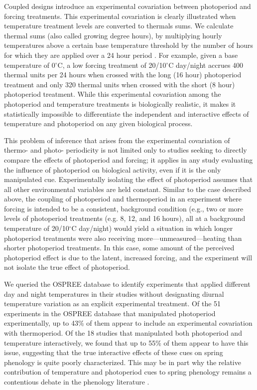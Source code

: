 \documentclass[11pt]{article}
\begin{document}
Coupled designs introduce an experimental covariation between photoperiod and forcing treatments. This experimental covariation is clearly illustrated when temperature treatment levels are converted to thermals sums. We calculate thermal sums (also called growing degree hours), by multiplying hourly temperatures above a certain base temperature threshold by the number of hours for which they are applied over a 24 hour period \citep{Parent:2019ug}. For example, given a base temperature of 0$^{\circ}$C, a low forcing treatment of 20/10$^{\circ}$C day/night accrues 400 thermal units per 24 hours  when crossed with the long (16 hour) photoperiod treatment and only 320 thermal units when crossed with the short (8 hour) photoperiod treatment. While this experimental covariation among the photoperiod and temperature treatments is biologically realistic, it makes it statistically impossible to differentiate the independent and interactive effects of temperature and photoperiod on any given biological process.

This problem of inference that arises from the experimental covariation of thermo- and photo- periodicity is not limited only to studies seeking to directly compare the effects of photoperiod and forcing; it applies in any study evaluating the influence of photoperiod on biological activity, even if it is the only manipulated cue. Experimentally isolating the effect of photoperiod assumes that all other environmental variables are held constant.  Similar to the case described above, the coupling of photoperiod and thermoperiod in an experiment where forcing is intended to be a consistent, background condition (e.g., two or more levels of photoperiod treatments (e.g. 8, 12, and 16 hours), all at a background temperature of 20/10$^{\circ}$C day/night) would yield a situation in which longer photoperiod treatments were also receiving more---unmeasured---heating than shorter photoperiod treatments. In this case, some amount of the perceived photoperiod effect is due to the latent, increased forcing, and the experiment will not isolate the true effect of photoperiod.

We queried the OSPREE database to identify experiments that applied different day and night temperatures in their studies without designating diurnal temperature variation as an explicit experimental treatment. Of the 51 experiments in the OSPREE database that manipulated photoperiod experimentally, up to 43\% of them appear to include an experimental covariation with thermoperiod. Of the 18 studies that manipulated both photoperiod and temperature interactively, we found that up to 55\% of them appear to have this issue, suggesting that the true interactive effects of these cues on spring phenology is quite poorly characterized. This may be in part why the relative contribution of temperature and photoperiod cues to spring phenology remains a contentious debate in the phenology literature \citep{koerner2010a,CHUINE:2010wg,Jennifer:2010un}.
\end{document}
